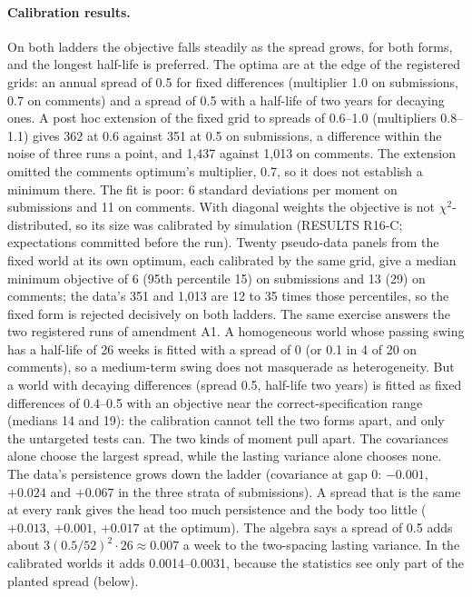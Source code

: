 \documentclass[10pt]{article}
\begin{document}
\paragraph{Calibration results.} On both ladders the objective falls steadily as the spread grows, for both forms, and the longest half-life is preferred. The optima are at the edge of the registered grids: an annual spread of 0.5 for fixed differences (multiplier 1.0 on submissions, 0.7 on comments) and a spread of 0.5 with a half-life of two years for decaying ones. A post hoc extension of the fixed grid to spreads of 0.6--1.0 (multipliers 0.8--1.1) gives 362 at 0.6 against 351 at 0.5 on submissions, a difference within the noise of three runs a point, and 1,437 against 1,013 on comments. The extension omitted the comments optimum's multiplier, 0.7, so it does not establish a minimum there. The fit is poor: 6 standard deviations per moment on submissions and 11 on comments. With diagonal weights the objective is not $\chi^2$-distributed, so its size was calibrated by simulation (RESULTS R16-C; expectations committed before the run). Twenty pseudo-data panels from the fixed world at its own optimum, each calibrated by the same grid, give a median minimum objective of 6 (95th percentile 15) on submissions and 13 (29) on comments; the data's 351 and 1,013 are 12 to 35 times those percentiles, so the fixed form is rejected decisively on both ladders. The same exercise answers the two registered runs of amendment A1. A homogeneous world whose passing swing has a half-life of 26 weeks is fitted with a spread of 0 (or 0.1 in 4 of 20 on comments), so a medium-term swing does not masquerade as heterogeneity. But a world with decaying differences (spread 0.5, half-life two years) is fitted as fixed differences of 0.4--0.5 with an objective near the correct-specification range (medians 14 and 19): the calibration cannot tell the two forms apart, and only the untargeted tests can. The two kinds of moment pull apart. The covariances alone choose the largest spread, while the lasting variance alone chooses none. The data's persistence grows down the ladder (covariance at gap 0: $-0.001$, $+0.024$ and $+0.067$ in the three strata of submissions). A spread that is the same at every rank gives the head too much persistence and the body too little ($+0.013$, $+0.001$, $+0.017$ at the optimum). The algebra says a spread of 0.5 adds about $3(0.5/52)^2\cdot 26 \approx 0.007$ a week to the two-spacing lasting variance. In the calibrated worlds it adds 0.0014--0.0031, because the statistics see only part of the planted spread (below).
\end{document}
